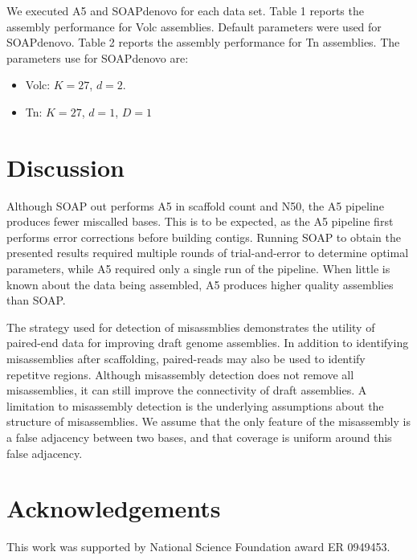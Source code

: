 \documentclass{bioinfo}
\begin{document}
We executed A5 and SOAPdenovo for each data set. Table 1 reports the assembly performance for Volc assemblies.
Default parameters were used for SOAPdenovo. Table 2 reports the assembly performance for Tn assemblies. The parameters 
use for SOAPdenovo are:
\begin{itemize}
\item Volc: $K = 27$, $d = 2$.
\item Tn: $K = 27$, $d = 1$, $D = 1$
\end{itemize}


\section{Discussion}

Although SOAP out performs A5 in scaffold count and N50, the A5 pipeline produces fewer miscalled bases. This is to
be expected, as the A5 pipeline first performs error corrections before building contigs. Running SOAP to
obtain the presented results required multiple rounds of trial-and-error to determine optimal parameters, while A5 required
only a single run of the pipeline. When little is known about the data being assembled, A5 produces higher quality assemblies 
than SOAP.

The strategy used for detection of misassmblies demonstrates the utility of paired-end data for improving draft genome assemblies.
In addition to identifying misassemblies after scaffolding, paired-reads may also be used to identify repetitve regions.   
Although misassembly detection does not remove all misassemblies, it can still improve the connectivity of draft assemblies.
A limitation to misassembly detection is the underlying assumptions about the structure of misassemblies. We assume that the only
feature of the misassembly is a false adjacency between two bases, and that coverage is uniform around this false adjacency. 


\section*{Acknowledgements}
This work was supported by National Science Foundation award ER 0949453.



\end{document}
